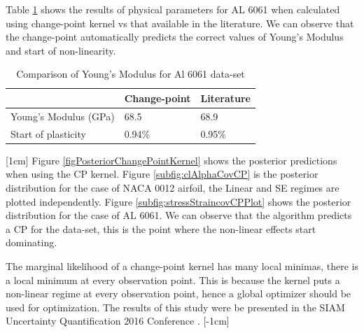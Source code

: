 Table \ref{tabComparisonOfYoungModulus6061Data} shows the results of physical parameters for AL 6061 when calculated using change-point kernel vs that available in the literature. We can observe that the change-point automatically predicts the correct values of Young's Modulus and start of non-linearity.


\begin{table}[!ht]
    \centering
\begin{tabular}{|l|l|l|}
  \hline
    & Change-point & Literature \\
  \hline 
  \hline
Young's Modulus (GPa) &  68.5 & 68.9\\
Start of plasticity  & 0.94\% & 0.95\%\\
   \hline
\end{tabular}
\caption{Comparison of Young's Modulus for Al 6061 data-set}
  \label{tabComparisonOfYoungModulus6061Data}
\end{table}

[1cm]
Figure \ref{figPosteriorChangePointKernel} shows the posterior predictions when using the CP kernel. Figure \ref{subfig:clAlphaCovCP} is the posterior distribution for the case of NACA 0012 airfoil, the Linear and SE regimes are plotted independently. Figure \ref{subfig:stressStraincovCPPlot} shows the posterior distribution for the case of AL 6061. We can observe that the algorithm predicts a CP for the data-set, this is the point where the non-linear effects start dominating. 

The marginal likelihood of a change-point kernel has many local minimas, there is a local minimum at every observation point. This is because the kernel puts a non-linear regime at every observation point, hence a global optimizer should be used for optimization. The results of this study were be presented in the SIAM Uncertainty Quantification 2016 Conference \cite{chiplunkar:hal-01555401}.
[-1cm]


